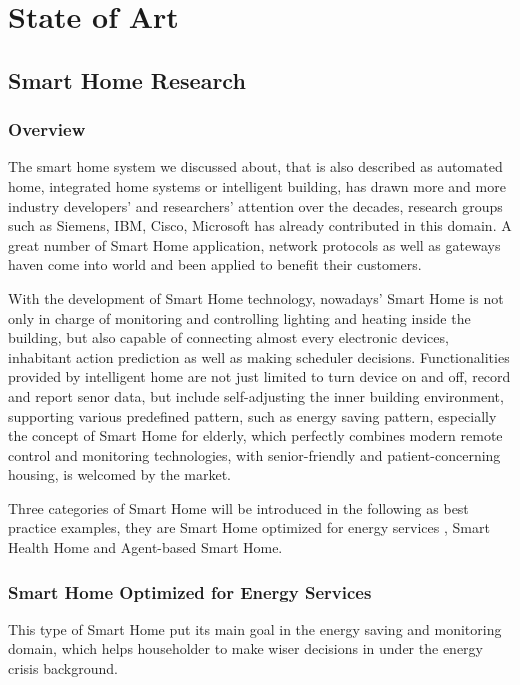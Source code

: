 \chapter{State of Art}
\section{Smart Home Research}
\subsection{Overview}
The smart home system we discussed about, that is also described as automated home, integrated home systems or intelligent building\cite{smart_home_concept}, has drawn more and more industry developers' and researchers' attention over the decades, research groups such as Siemens, IBM, Cisco, Microsoft\cite{smart_home_research} has already contributed in this domain. A great number of Smart Home application, network protocols as well as gateways\cite{smart_home_for_gateway} haven come into world and been applied to benefit their customers.

With the development of Smart Home technology, nowadays' Smart Home is not only  in charge of monitoring and controlling lighting and heating inside the building, but also capable of connecting almost every electronic devices, inhabitant action prediction as well as making scheduler decisions. Functionalities provided by intelligent home are not just limited to turn device on and off, record and report senor data, but include self-adjusting the inner building environment, supporting various predefined pattern, such as energy saving pattern, especially the concept of Smart Home for elderly\cite{smart_home_for_old}, which perfectly combines modern remote control and monitoring technologies, with senior-friendly and patient-concerning housing, is welcomed by the market. 

Three categories of Smart Home will be introduced in the following as best practice examples, they are Smart Home optimized for energy services , Smart Health Home and Agent-based Smart Home.
 
\subsection{Smart Home Optimized for Energy Services}
This type of Smart Home put its main goal in the energy saving and monitoring domain, which helps householder to make wiser decisions in under the energy crisis background. 

